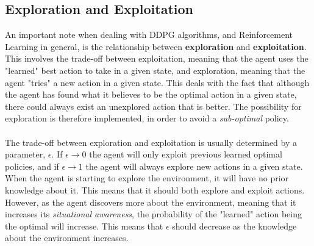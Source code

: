 \subsection{Exploration and Exploitation}
An important note when dealing with DDPG algorithms, and Reinforcement Learning in general, is the relationship between \textbf{exploration} and \textbf{exploitation}. This involves the trade-off between exploitation, meaning that the agent uses the "learned" best action to take in a given state, and exploration, meaning that the agent "tries" a new action in a given state. This deals with the fact that although the agent has found what it believes to be the optimal action in a given state, there could always exist an unexplored action that is better. The possibility for exploration is therefore implemented, in order to avoid a \textit{sub-optimal} policy.\\\\
The trade-off between exploration and exploitation is usually determined by a parameter, $\epsilon$. If $\epsilon \longrightarrow 0$ the agent will only exploit previous learned optimal policies, and if $\epsilon \longrightarrow 1$ the agent will always explore new actions in a given state. When the agent is starting to explore the environment, it will have no prior knowledge about it. This means that it should both explore and exploit actions. However, as the agent discovers more about the environment, meaning that it increases its \textit{situational awareness}, the probability of the "learned" action being the optimal will increase. This means that $\epsilon$ should decrease as the knowledge about the environment increases. 





